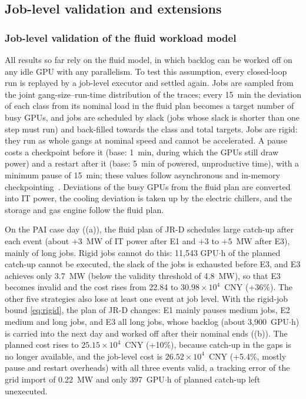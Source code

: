 \subsection{Job-level validation and extensions}
\label{sec:res-ext}

\subsubsection{Job-level validation of the fluid workload model}
\label{sec:res-job}

All results so far rely on the fluid model, in which backlog can be worked off on any idle GPU with any parallelism. To
test this assumption, every closed-loop run is replayed by a job-level executor and settled again. Jobs are sampled from
the joint gang-size--run-time distribution of the traces; every 15~min the deviation of each class from its nominal load
in the fluid plan becomes a target number of busy GPUs, and jobs are scheduled by slack (jobs whose slack is shorter than
one step must run) and back-filled towards the class and total targets. Jobs are rigid: they run as whole gangs at
nominal speed and cannot be accelerated. A pause costs a checkpoint before it (base: 1~min, during which the GPUs still
draw power) and a restart after it (base: 5~min of powered, unproductive time), with a minimum pause of 15~min; these
values follow asynchronous and in-memory checkpointing~\cite{wan2025,wang2023gemini,hu2024acme}. Deviations of the busy
GPUs from the fluid plan are converted into IT power, the cooling deviation is taken up by the electric chillers, and the
storage and gas engine follow the fluid plan.

On the PAI case day ((a)), the fluid plan of JR-D schedules large catch-up after each event (about
$+3$~MW of IT power after E1 and $+3$ to $+5$~MW after E3), mainly of long jobs. Rigid jobs cannot do this: 11,543
GPU$\cdot$h of the planned catch-up cannot be executed, the slack of the jobs is exhausted before E3, and E3 achieves
only 3.7~MW (below the validity threshold of 4.8~MW), so that E3 becomes invalid and the cost rises from 22.84 to
$30.98\times10^4$~CNY (+36\%). The other five strategies also lose at least one event at job level. With the rigid-job
bound \eqref{eq:rigid}, the plan of JR-D changes: E1 mainly pauses medium jobs, E2 medium and long jobs, and E3 all long
jobs, whose backlog (about 3,900~GPU$\cdot$h) is carried into the next day and worked off after their nominal ends
((b)). The planned cost rises to $25.15\times10^4$~CNY (+10\%), because catch-up in the gaps is no
longer available, and the job-level cost is $26.52\times10^4$~CNY (+5.4\%, mostly pause and restart overheads) with all
three events valid, a tracking error of the grid import of 0.22~MW and only 397~GPU$\cdot$h of planned catch-up left
unexecuted.

